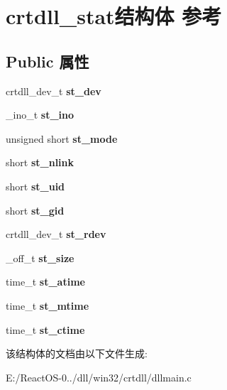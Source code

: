\hypertarget{structcrtdll__stat}{}\section{crtdll\+\_\+stat结构体 参考}
\label{structcrtdll__stat}
\subsection*{Public 属性}
\begin{DoxyCompactItemize}
\item 
\mbox{\label{structcrtdll__stat_aed2ab8b072d20cc17c68231306a62d8f}} 
crtdll\+\_\+dev\+\_\+t {\bfseries st\+\_\+dev}
\item 
\mbox{\label{structcrtdll__stat_a8f282c80035d7f20639887199704c42a}} 
\+\_\+ino\+\_\+t {\bfseries st\+\_\+ino}
\item 
\mbox{\label{structcrtdll__stat_a4e4c2ec5f12228d882fda9355edf8a6b}} 
unsigned short {\bfseries st\+\_\+mode}
\item 
\mbox{\label{structcrtdll__stat_a251b55c366dc9e971801f9caf5d922df}} 
short {\bfseries st\+\_\+nlink}
\item 
\mbox{\label{structcrtdll__stat_ab4baa5eaa7d71ea0dd7ec434618b560c}} 
short {\bfseries st\+\_\+uid}
\item 
\mbox{\label{structcrtdll__stat_a3847f6b9204c6a363eeb952004d514e1}} 
short {\bfseries st\+\_\+gid}
\item 
\mbox{\label{structcrtdll__stat_af8de116b59db4295e9e6a11efe2a9088}} 
crtdll\+\_\+dev\+\_\+t {\bfseries st\+\_\+rdev}
\item 
\mbox{\label{structcrtdll__stat_ad357df92e1f0fccd0585206a3a5f9ee0}} 
\+\_\+off\+\_\+t {\bfseries st\+\_\+size}
\item 
\mbox{\label{structcrtdll__stat_ab2859d7873efcc0e5e0f424e8ea584a3}} 
time\+\_\+t {\bfseries st\+\_\+atime}
\item 
\mbox{\label{structcrtdll__stat_aa228f88932b8130cadd8768ba371fb43}} 
time\+\_\+t {\bfseries st\+\_\+mtime}
\item 
\mbox{\label{structcrtdll__stat_a5f9c30c5af6b4870c67f5051003cbed2}} 
time\+\_\+t {\bfseries st\+\_\+ctime}
\end{DoxyCompactItemize}


该结构体的文档由以下文件生成\+:\begin{DoxyCompactItemize}
\item 
E\+:/\+React\+O\+S-\/0../dll/win32/crtdll/dllmain.\+c\end{DoxyCompactItemize}
